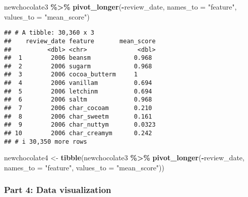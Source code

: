 \documentclass[
]{article}
\newenvironment{Shaded}{\begin{snugshade}}{\end{snugshade}}
\newcommand{\AttributeTok}[1]{\textcolor[rgb]{0.13,0.29,0.53}{#1}}
\newcommand{\FunctionTok}[1]{\textcolor[rgb]{0.13,0.29,0.53}{\textbf{#1}}}
\newcommand{\NormalTok}[1]{#1}
\newcommand{\OtherTok}[1]{\textcolor[rgb]{0.56,0.35,0.01}{#1}}
\newcommand{\SpecialCharTok}[1]{\textcolor[rgb]{0.81,0.36,0.00}{\textbf{#1}}}
\newcommand{\StringTok}[1]{\textcolor[rgb]{0.31,0.60,0.02}{#1}}
\begin{document}
\begin{Shaded}
\begin{Highlighting}[]
\NormalTok{newchocolate3 }\SpecialCharTok{\%\textgreater{}\%} \FunctionTok{pivot\_longer}\NormalTok{(}\SpecialCharTok{{-}}\NormalTok{review\_date, }\AttributeTok{names\_to =} \StringTok{"feature"}\NormalTok{, }\AttributeTok{values\_to =} \StringTok{"mean\_score"}\NormalTok{)}
\end{Highlighting}
\end{Shaded}

\begin{verbatim}
## # A tibble: 30,360 x 3
##    review_date feature       mean_score
##          <dbl> <chr>              <dbl>
##  1        2006 beansm            0.968 
##  2        2006 sugarm            0.968 
##  3        2006 cocoa_butterm     1     
##  4        2006 vanillam          0.694 
##  5        2006 letchinm          0.694 
##  6        2006 saltm             0.968 
##  7        2006 char_cocoam       0.210 
##  8        2006 char_sweetm       0.161 
##  9        2006 char_nuttym       0.0323
## 10        2006 char_creamym      0.242 
## # i 30,350 more rows
\end{verbatim}

\begin{Shaded}
\begin{Highlighting}[]
\NormalTok{newchocolate4 }\OtherTok{\textless{}{-}} \FunctionTok{tibble}\NormalTok{(newchocolate3 }\SpecialCharTok{\%\textgreater{}\%} \FunctionTok{pivot\_longer}\NormalTok{(}\SpecialCharTok{{-}}\NormalTok{review\_date, }\AttributeTok{names\_to =} \StringTok{"feature"}\NormalTok{, }\AttributeTok{values\_to =} \StringTok{"mean\_score"}\NormalTok{))}
\end{Highlighting}
\end{Shaded}

\hypertarget{part-4-data-visualization}{%
\subsubsection{Part 4: Data
visualization}\label{part-4-data-visualization}}
\end{document}

